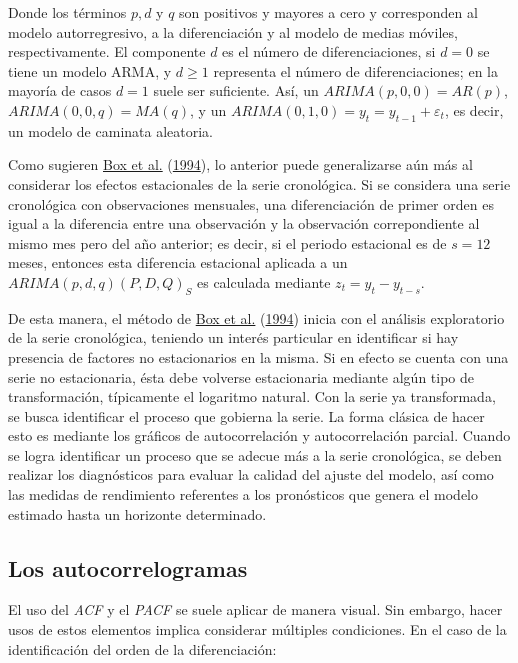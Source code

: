 \documentclass[
]{article}
\begin{document}
Donde los términos \(p, d\) y \(q\) son positivos y mayores a cero y
corresponden al modelo autorregresivo, a la diferenciación y al modelo
de medias móviles, respectivamente. El componente \(d\) es el número de
diferenciaciones, si \(d=0\) se tiene un modelo ARMA, y \(d\geq1\)
representa el número de diferenciaciones; en la mayoría de casos \(d=1\)
suele ser suficiente. Así, un \(ARIMA(p,0,0)=AR(p)\),
\(ARIMA(0,0,q)=MA(q)\), y un \(ARIMA(0,1,0)=y_t=y_{t-1}+\varepsilon_t\),
es decir, un modelo de caminata aleatoria.

Como sugieren \protect\hyperlink{ref-box-jenkins}{Box et al.}
(\protect\hyperlink{ref-box-jenkins}{1994}), lo anterior puede
generalizarse aún más al considerar los efectos estacionales de la serie
cronológica. Si se considera una serie cronológica con observaciones
mensuales, una diferenciación de primer orden es igual a la diferencia
entre una observación y la observación correpondiente al mismo mes pero
del año anterior; es decir, si el periodo estacional es de \(s=12\)
meses, entonces esta diferencia estacional aplicada a un
\(ARIMA(p,d,q)(P,D,Q)_S\) es calculada mediante \(z_t=y_t-y_{t-s}\).

De esta manera, el método de \protect\hyperlink{ref-box-jenkins}{Box et
al.} (\protect\hyperlink{ref-box-jenkins}{1994}) inicia con el análisis
exploratorio de la serie cronológica, teniendo un interés particular en
identificar si hay presencia de factores no estacionarios en la misma.
Si en efecto se cuenta con una serie no estacionaria, ésta debe volverse
estacionaria mediante algún tipo de transformación, típicamente el
logaritmo natural. Con la serie ya transformada, se busca identificar el
proceso que gobierna la serie. La forma clásica de hacer esto es
mediante los gráficos de autocorrelación y autocorrelación parcial.
Cuando se logra identificar un proceso que se adecue más a la serie
cronológica, se deben realizar los diagnósticos para evaluar la calidad
del ajuste del modelo, así como las medidas de rendimiento referentes a
los pronósticos que genera el modelo estimado hasta un horizonte
determinado.

\subsection{Los autocorrelogramas}

El uso del \emph{ACF} y el \emph{PACF} se suele aplicar de manera
visual. Sin embargo, hacer usos de estos elementos implica considerar
múltiples condiciones. En el caso de la identificación del orden de la
diferenciación:
\end{document}
